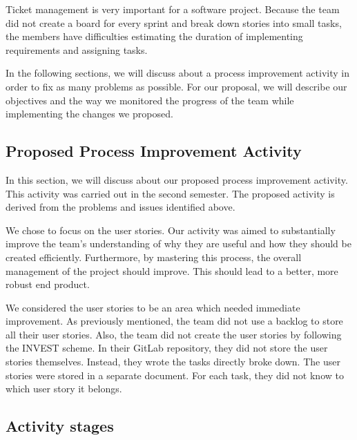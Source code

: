 \documentclass[11pt]{article}
\begin{document}
\par
Ticket management is very important for a software project. Because the team did not create a board for every sprint and break down stories into small tasks, the members have difficulties estimating the duration of implementing requirements and assigning tasks.

\par
In the following sections, we will discuss about a process improvement activity in order  to fix as many problems as possible. For our proposal, we will describe our objectives and the way we monitored the progress of the team while implementing the changes we proposed.


\subsection*{Proposed Process Improvement Activity}

\par
In this section, we will discuss about our proposed process improvement activity. This activity was carried out in the second semester. The proposed activity is derived from the problems and issues identified above.

\par
We chose to focus on the user stories. Our activity was aimed to substantially improve the team's understanding of why they are useful and how they should be created efficiently. Furthermore, by mastering this process, the overall management of the project should improve. This should lead to a better, more robust end product.

\par
We considered the user stories to be an area which needed immediate improvement. As previously mentioned, the team did not use a backlog to store all their user stories. Also, the team did not create the user stories by following the INVEST scheme. In their GitLab repository, they did not store the user stories themselves. Instead, they wrote the tasks directly broke down. The user stories were stored in a separate document. For each task, they did not know to which user story it belongs.

\subsection*{Activity stages}
\end{document}
